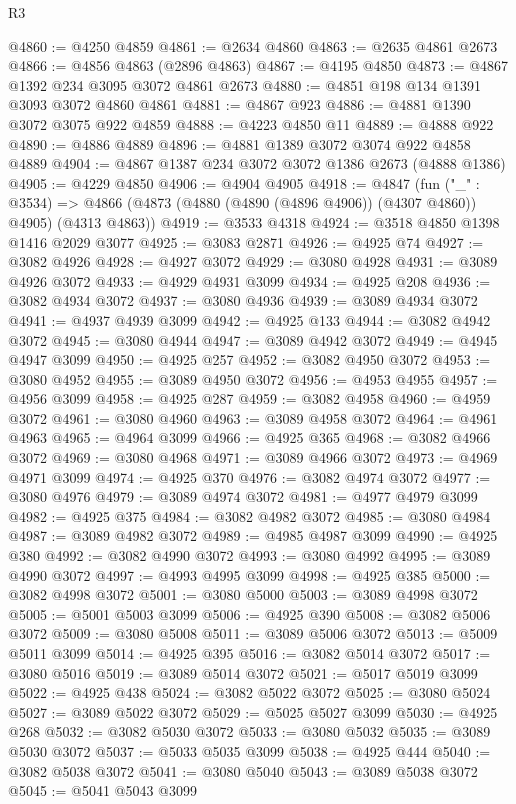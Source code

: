 \begin{lexlean}{R3}
\begin{coremodule}
@4860 := @4250 @4859
@4861 := @2634 @4860
@4863 := @2635 @4861 @2673
@4866 := @4856 @4863 (@2896 @4863)
@4867 := @4195 @4850
@4873 := @4867 @1392 @234 @3095 @3072 @4861 @2673
@4880 := @4851 @198 @134 @1391 @3093 @3072 @4860 @4861
@4881 := @4867 @923
@4886 := @4881 @1390 @3072 @3075 @922 @4859
@4888 := @4223 @4850 @11
@4889 := @4888 @922
@4890 := @4886 @4889
@4896 := @4881 @1389 @3072 @3074 @922 @4858 @4889
@4904 := @4867 @1387 @234 @3072 @3072 @1386 @2673 (@4888 @1386)
@4905 := @4229 @4850
@4906 := @4904 @4905
@4918 := @4847
    (fun ("_" : @3534) =>
    @4866 (@4873 (@4880 (@4890 (@4896 @4906)) (@4307 @4860)) @4905) (@4313 @4863))
@4919 := @3533 @4318
@4924 := @3518 @4850 @1398 @1416 @2029 @3077
@4925 := @3083 @2871
@4926 := @4925 @74
@4927 := @3082 @4926
@4928 := @4927 @3072
@4929 := @3080 @4928
@4931 := @3089 @4926 @3072
@4933 := @4929 @4931 @3099
@4934 := @4925 @208
@4936 := @3082 @4934 @3072
@4937 := @3080 @4936
@4939 := @3089 @4934 @3072
@4941 := @4937 @4939 @3099
@4942 := @4925 @133
@4944 := @3082 @4942 @3072
@4945 := @3080 @4944
@4947 := @3089 @4942 @3072
@4949 := @4945 @4947 @3099
@4950 := @4925 @257
@4952 := @3082 @4950 @3072
@4953 := @3080 @4952
@4955 := @3089 @4950 @3072
@4956 := @4953 @4955
@4957 := @4956 @3099
@4958 := @4925 @287
@4959 := @3082 @4958
@4960 := @4959 @3072
@4961 := @3080 @4960
@4963 := @3089 @4958 @3072
@4964 := @4961 @4963
@4965 := @4964 @3099
@4966 := @4925 @365
@4968 := @3082 @4966 @3072
@4969 := @3080 @4968
@4971 := @3089 @4966 @3072
@4973 := @4969 @4971 @3099
@4974 := @4925 @370
@4976 := @3082 @4974 @3072
@4977 := @3080 @4976
@4979 := @3089 @4974 @3072
@4981 := @4977 @4979 @3099
@4982 := @4925 @375
@4984 := @3082 @4982 @3072
@4985 := @3080 @4984
@4987 := @3089 @4982 @3072
@4989 := @4985 @4987 @3099
@4990 := @4925 @380
@4992 := @3082 @4990 @3072
@4993 := @3080 @4992
@4995 := @3089 @4990 @3072
@4997 := @4993 @4995 @3099
@4998 := @4925 @385
@5000 := @3082 @4998 @3072
@5001 := @3080 @5000
@5003 := @3089 @4998 @3072
@5005 := @5001 @5003 @3099
@5006 := @4925 @390
@5008 := @3082 @5006 @3072
@5009 := @3080 @5008
@5011 := @3089 @5006 @3072
@5013 := @5009 @5011 @3099
@5014 := @4925 @395
@5016 := @3082 @5014 @3072
@5017 := @3080 @5016
@5019 := @3089 @5014 @3072
@5021 := @5017 @5019 @3099
@5022 := @4925 @438
@5024 := @3082 @5022 @3072
@5025 := @3080 @5024
@5027 := @3089 @5022 @3072
@5029 := @5025 @5027 @3099
@5030 := @4925 @268
@5032 := @3082 @5030 @3072
@5033 := @3080 @5032
@5035 := @3089 @5030 @3072
@5037 := @5033 @5035 @3099
@5038 := @4925 @444
@5040 := @3082 @5038 @3072
@5041 := @3080 @5040
@5043 := @3089 @5038 @3072
@5045 := @5041 @5043 @3099

\end{coremodule}
\end{lexlean}
